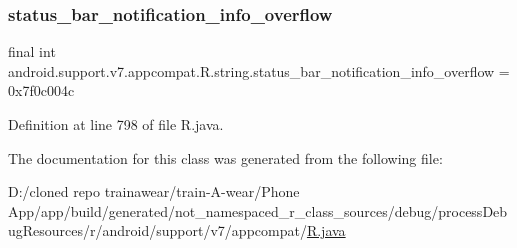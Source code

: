 \subsubsection{\texorpdfstring{status\_bar\_notification\_info\_overflow}{status\_bar\_notification\_info\_overflow}}
{\footnotesize\ttfamily final int android.\+support.\+v7.\+appcompat.\+R.\+string.\+status\+\_\+bar\+\_\+notification\+\_\+info\+\_\+overflow = 0x7f0c004c\hspace{0.3cm}{\ttfamily [static]}}



Definition at line 798 of file R.\+java.



The documentation for this class was generated from the following file\+:\begin{DoxyCompactItemize}
\item 
D\+:/cloned repo trainawear/train-\/\+A-\/wear/\+Phone App/app/build/generated/not\+\_\+namespaced\+\_\+r\+\_\+class\+\_\+sources/debug/process\+Debug\+Resources/r/android/support/v7/appcompat/\mbox{\hyperlink{process_debug_resources_2r_2android_2support_2v7_2appcompat_2_r_8java}{R.\+java}}\end{DoxyCompactItemize}
